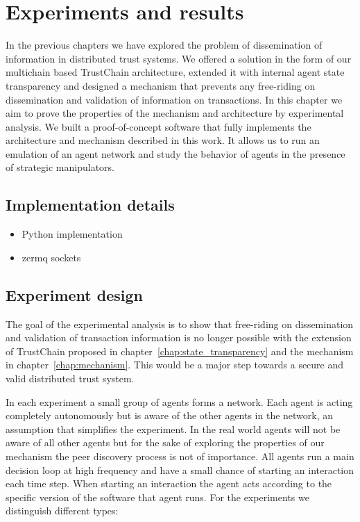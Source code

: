 \chapter{Experiments and results}
In the previous chapters we have explored the problem of dissemination of information in distributed
trust systems. We offered a solution in the form of our multichain based TrustChain architecture, extended 
it with internal agent state transparency and designed a mechanism that prevents any free-riding on
dissemination and validation of information on transactions. In this chapter we aim to prove the 
properties of the mechanism and architecture by experimental analysis. We built a proof-of-concept
software that fully implements the architecture and mechanism described in this work. It allows us 
to run an emulation of an agent network and study the behavior of agents in the presence of strategic
manipulators.

\section{Implementation details}
\begin{itemize}
    \item Python implementation 
    \item zermq sockets
\end{itemize}


\section{Experiment design}
The goal of the experimental analysis is to show that free-riding on dissemination and validation of
transaction information is no longer possible with the extension of TrustChain proposed in 
chapter~\ref{chap:state_transparency} and the mechanism in chapter~\ref{chap:mechanism}. This would
be a major step towards a secure and valid distributed trust system. 

In each experiment a small group of agents forms a network. Each agent is acting completely autonomously 
but is aware of the other agents in the network, an assumption that simplifies the experiment. In the
real world agents will not be aware of all other agents but for the sake of exploring the properties
of our mechanism the peer discovery process is not of importance. All agents run a main decision loop
at high frequency and have a small chance of starting an interaction each time step. When starting 
an interaction the agent acts according to the specific version of the software that agent runs. For
the experiments we distinguish different types: 


